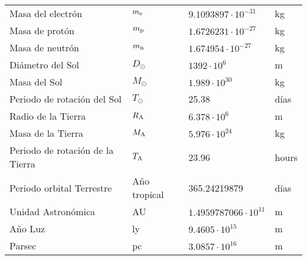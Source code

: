 \begin{center}
\begin{tabular}{||l|lll||}
Masa del electrón     &$m_{\rm e}$&$9.1093897\cdot10^{-31}$&kg\rule{0pt}{13pt}\\
Masa de protón        &$m_{\rm p}$&$1.6726231\cdot10^{-27}$&kg\\
Masa de neutrón      &$m_{\rm n}$&$1.674954\cdot10^{-27}$&kg\\
\hline
Diámetro del Sol       &$D_\odot$&$1392\cdot10^6$&m\rule{0pt}{13pt}\\
Masa del Sol             &$M_\odot$&$1.989\cdot10^{30}$&kg\\
Periodo de rotación del Sol &$T_\odot$&25.38&días\\
Radio de la Tierra     &$R_{\rm A}$&$6.378\cdot10^6$&m\\
Masa de la Tierra     &$M_{\rm A}$&$5.976\cdot10^{24}$&kg\\
Periodo de rotación de la Tierra   &$T_{\rm A}$&23.96&hours\\
Periodo orbital Terrestre        &Año tropical&365.24219879&días\\
Unidad Astronómica            &AU&$1.4959787066\cdot10^{11}$&m\\
Año Luz                   &ly&$9.4605\cdot10^{15}$&m\\
Parsec                       &pc&$3.0857\cdot10^{16}$&m\\
\hline
\end{tabular}
\end{center}
